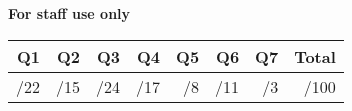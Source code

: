 \vfill

\smallskip
\smallskip
\smallskip
\smallskip
\smallskip

\begin{center}
{\bf For staff use only}\\
\begin{Large}
\begin{tabular}{|r|r|r|r|r|r|r|r|}
\hline
Q1 & Q2 & Q3 & Q4 & Q5 & Q6 & Q7 & Total \\
\hline
\quad/22 &\quad/15 & \quad/24 & \quad/17 &\quad/8 &\quad/11 &\quad/3 & \quad/100 \\
\hline
\end{tabular}\end{Large}
\end{center}

\newpage

\newpage

\newpage

\newpage

\newpage

\newpage

\newpage


